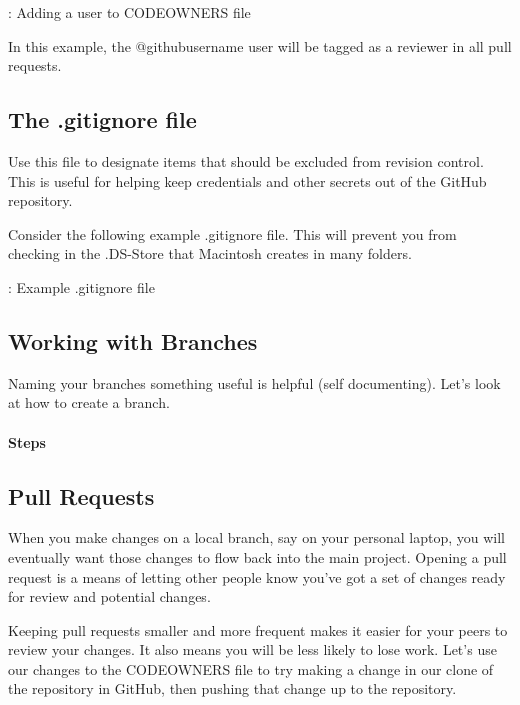 \begin{mybox}{\thetcbcounter: Adding a user to CODEOWNERS file}
      
\end{mybox}
\justify{}
In this example, the @githubusername user will be tagged as a reviewer
in all pull requests.

\subsection{The .gitignore file}
\justify{}
Use this file to designate items that should be excluded from revision
control. This is useful for helping keep credentials and other secrets
out of the GitHub repository.

\justify{}
Consider the following example .gitignore file. This will prevent you
from checking in the .DS-Store that Macintosh creates in many folders.

\begin{mybox}{\thetcbcounter: Example .gitignore file}
      
\end{mybox}

\subsection{Working with Branches}
\justify{}
Naming your branches something useful is helpful (self documenting). Let's look at how
to create a branch.

\hypertarget{steps-3}{%
      \paragraph{Steps}\label{steps-3}}

\subsection{Pull Requests}
\justify{}
When you make changes on a local branch, say on your personal laptop,
you will eventually want those changes to flow back into the main
project. Opening a pull request is a means of letting other
people know you've got a set of changes ready for review and potential changes.

\justify{}
Keeping pull requests smaller and more frequent makes it easier for your
peers to review your changes. It also means you will be less likely to lose work.
\justify{}
Let's use our changes to the CODEOWNERS file to try making a change in
our clone of the repository in GitHub, then pushing that change up to
the repository.

